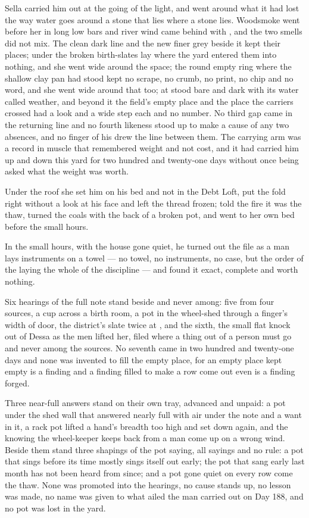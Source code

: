 Sella carried him out at the going of the light, and  went around what it had lost the way water goes around a stone that lies where a stone lies. Woodsmoke went before her in long low bars and river wind came behind with , and the two smells did not mix. The clean dark line and the new finer grey beside it kept their places; under  the broken birth-slates lay where the yard entered them into nothing, and she went wide around the space; the round empty ring where the shallow clay pan had stood kept no scrape, no crumb, no print, no chip and no word, and she went wide around that too; at   stood bare and dark with its water called weather, and beyond it the field's empty place and the place the carriers crossed had a look and a wide step each and no number. No third gap came in the returning line and no fourth likeness stood up to make a cause of any two absences, and no finger of his drew the line between them. The carrying arm was a record in muscle that remembered weight and not cost, and it had carried him up and down this yard for two hundred and twenty-one days without once being asked what the weight was worth.

Under the roof she set him on his bed and not in the Debt Loft, put the fold right without a look at his face and left the thread frozen; told the fire it was the thaw, turned the coals with the back of a broken pot, and went to her own bed before the small hours.

\scenebreak

In the small hours, with the house gone quiet, he turned out the file as a man lays instruments on a towel --- no towel, no instruments, no case, but the order of the laying the whole of the discipline --- and found it exact, complete and worth nothing.

Six hearings of the full note stand beside and never among: five from four sources, a cup across a birth room, a pot in the wheel-shed through a finger's width of door, the district's slate twice at , and the sixth, the small flat knock out of Dessa as the men lifted her, filed where a thing out of a person must go and never among the sources. No seventh came in two hundred and twenty-one days and none was invented to fill the empty place, for an empty place kept empty is a finding and a finding filled to make a row come out even is a finding forged.

Three near-full answers stand on their own tray, advanced and unpaid: a pot under the shed wall that answered nearly full with air under the note and a want in it, a rack pot lifted a hand's breadth too high and set down again, and the knowing the wheel-keeper keeps back from a man come up on a wrong wind. Beside them stand three shapings of the pot saying, all sayings and no rule: a pot that sings before its time mostly sings itself out early; the pot that sang early last month has not been heard from since; and a pot gone quiet on every row come the thaw. None was promoted into the hearings, no cause stands up, no lesson was made, no name was given to what ailed the man carried out on Day 188, and no pot was lost in the yard.

